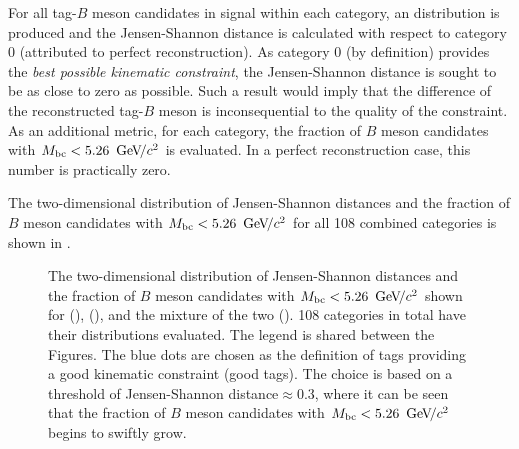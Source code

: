 For all tag-$B$ meson candidates in signal \MC within each category, an \Mbc distribution is produced 
and the Jensen-Shannon distance is calculated with respect to category 0 (attributed to perfect reconstruction).
As category 0 (by definition) provides the \textit{best possible kinematic constraint}, the Jensen-Shannon distance is sought to be as close to zero as possible.
Such a result would imply that the difference of the reconstructed tag-$B$ meson is inconsequential to the quality of the constraint.
As an additional metric, for each category, the fraction of $B$ meson candidates with ${M_{\mathrm{bc}}}<5.26~{\mathrm{\,Ge\kern -0.1em V\!/}c^2}$ is evaluated.
In a perfect reconstruction case, this number is practically zero.

The two-dimensional distribution of Jensen-Shannon distances and the fraction of $B$ meson candidates with ${M_{\mathrm{bc}}}<5.26~{\mathrm{\,Ge\kern -0.1em V\!/}c^2}$
for all 108 combined categories is shown in .
\begin{figure}[htbp!]
    \centering
    \caption{\label{fig:good_tags_jsdists} The two-dimensional distribution of Jensen-Shannon distances and the fraction of $B$ meson candidates with ${M_{\mathrm{bc}}}<5.26~{\mathrm{\,Ge\kern -0.1em V\!/}c^2}$
    shown for \BptoXsgamma (), \BztoXsgamma (), and the mixture of the two ().
    108 categories in total have their \Mbc distributions evaluated.
    The legend is shared between the Figures.
    The blue dots are chosen as the definition of tags providing a good kinematic constraint (good tags).
    The choice is based on a threshold of Jensen-Shannon distance$\approx0.3$, where it can be seen that the fraction of $B$ meson candidates with ${M_{\mathrm{bc}}}<5.26~{\mathrm{\,Ge\kern -0.1em V\!/}c^2}$ begins to swiftly grow.
    }
\end{figure}

